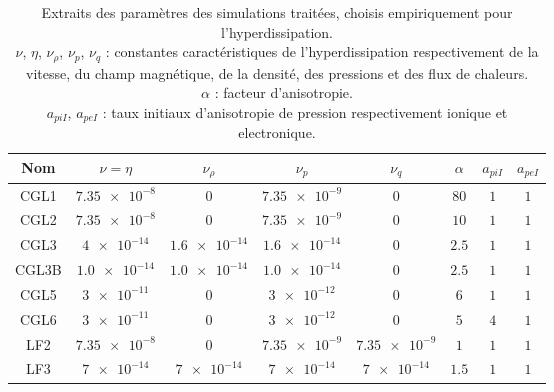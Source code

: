 \begin{table}[!ht]
\begin{center}
\begin{tabular}{ c|c|c|c|c|c|c|c } 
Nom & $\nu=\eta$ & $\nu_{\rho}$  & $\nu_p$ & $\nu_q$ & $\alpha$ & $a_{piI}$ & $a_{peI}$\\
\hline
CGL1 & $\num{7.35e-8}$ & $0$ & $\num{7.35e-9}$ & $0$ & $\num{80}$ & $\num{1}$ &  $\num{1}$ \\
CGL2 & $\num{7.35e-8}$ & $0$ & $\num{7.35e-9}$ & $0$& $\num{10}$ & $\num{1}$ &  $\num{1}$ \\
CGL3 & $\num{4e-14}$ & $\num{1.6e-14}$ & $\num{1.6e-14}$  & $0$& $\num{2.5}$ & $\num{1}$ &  $\num{1}$\\
CGL3B & $\num{1.0e-14}$ & $\num{1.0e-14}$ & $\num{1.0e-14}$ & $0$ & $\num{2.5}$ & $\num{1}$ &  $\num{1}$\\
CGL5 & $\num{3e-11}$ & $0$ & $\num{3e-12}$ & $0$& $\num{6}$ & $\num{1}$ &  $\num{1}$ \\
CGL6 & $\num{3e-11}$ & $0$ & $\num{3e-12}$ & $0$& $\num{5}$ & $\num{4}$ &  $\num{1}$  \\
\hline
LF2 & $\num{7.35e-8}$ & $0$ & $\num{7.35e-9}$& $\num{7.35e-9}$& $\num{1}$  & $\num{1}$ &  $\num{1}$\\
LF3 & $\num{7e-14}$ &$\num{7e-14}$ & $\num{7e-14}$ & $\num{7e-14}$ & $\num{1.5}$ & $\num{1}$ &  $\num{1}$\\
 \end{tabular}
 \cprotect\caption{Extraits des paramètres des simulations traitées, choisis empiriquement pour l'hyperdissipation. \\
 \ensuremath{\nu}, \ensuremath{\eta}, \ensuremath{\nu_{\rho}}, \ensuremath{\nu_p}, \ensuremath{\nu_q} : constantes caractéristiques de l'hyperdissipation respectivement de la vitesse, du champ magnétique, de la densité, des pressions et des flux de chaleurs. \\
 \ensuremath{\alpha} : facteur d'anisotropie. \\
 \ensuremath{a_{piI}}, \ensuremath{a_{peI}}  : taux initiaux d'anisotropie de pression respectivement ionique et electronique.}  \label{tab:setups_hd}
 \end{center}
 \end{table}
